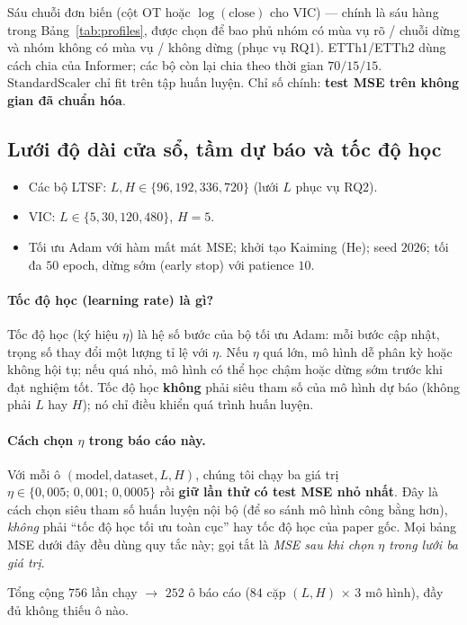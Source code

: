 Sáu chuỗi đơn biến (cột OT hoặc \(\log(\mathrm{close})\) cho VIC) ---
chính là sáu hàng trong Bảng~\ref{tab:profiles}, được chọn để bao phủ
nhóm có mùa vụ rõ / chuỗi dừng và nhóm không có mùa vụ / không dừng (phục vụ RQ1).
ETTh1/ETTh2 dùng cách chia của Informer; các bộ còn lại chia theo thời gian \(70/15/15\).
\(\mathrm{StandardScaler}\) chỉ fit trên tập huấn luyện.
Chỉ số chính: \textbf{test MSE trên không gian đã chuẩn hóa}.

\subsection{Lưới độ dài cửa sổ, tầm dự báo và tốc độ học}

\begin{itemize}
  \item Các bộ LTSF: \(L,H \in \{96,192,336,720\}\) (lưới \(L\) phục vụ RQ2).
  \item VIC: \(L \in \{5,30,120,480\}\), \(H=5\).
  \item Tối ưu Adam với hàm mất mát MSE; khởi tạo Kaiming (He); seed \(2026\);
        tối đa \(50\) epoch, dừng sớm (early stop) với patience \(10\).
\end{itemize}

\paragraph{Tốc độ học (learning rate) là gì?}
Tốc độ học (ký hiệu \(\eta\)) là hệ số bước của bộ tối ưu Adam:
mỗi bước cập nhật, trọng số thay đổi một lượng tỉ lệ với \(\eta\).
Nếu \(\eta\) quá lớn, mô hình dễ phân kỳ hoặc không hội tụ;
nếu quá nhỏ, mô hình có thể học chậm hoặc dừng sớm trước khi đạt nghiệm tốt.
Tốc độ học \textbf{không} phải siêu tham số của mô hình dự báo
(không phải \(L\) hay \(H\)); nó chỉ điều khiển quá trình huấn luyện.

\paragraph{Cách chọn \(\eta\) trong báo cáo này.}
Với mỗi ô \((\mathrm{model},\mathrm{dataset},L,H)\), chúng tôi chạy ba giá trị
\(\eta \in \{0{,}005;\,0{,}001;\,0{,}0005\}\) rồi \textbf{giữ lần thử có test MSE nhỏ nhất}.
Đây là cách chọn siêu tham số huấn luyện nội bộ (để so sánh mô hình công bằng hơn),
\emph{không} phải ``tốc độ học tối ưu toàn cục'' hay tốc độ học của paper gốc.
Mọi bảng MSE dưới đây đều dùng quy tắc này; gọi tắt là
\emph{MSE sau khi chọn \(\eta\) trong lưới ba giá trị}.

Tổng cộng \(756\) lần chạy \(\rightarrow\) \(252\) ô báo cáo
(\(84\) cặp \((L,H)\) \(\times\) \(3\) mô hình), đầy đủ không thiếu ô nào.
